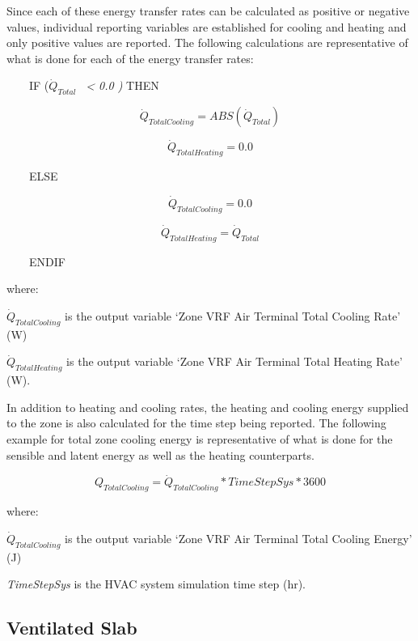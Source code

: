 Since each of these energy transfer rates can be calculated as positive or negative values, individual reporting variables are established for cooling and heating and only positive values are reported. The following calculations are representative of what is done for each of the energy transfer rates:

~~~~IF (\({\dot Q_{Total}}\) \emph{~\textless{} 0.0 )} THEN

\begin{equation}
{\dot Q_{TotalCooling}} = ABS ({\dot Q_{Total}})
\end{equation}

\begin{equation}
{\dot Q_{TotalHeating}} = 0.0
\end{equation}

~~~~ELSE

\begin{equation}
{\dot Q_{TotalCooling}} = 0.0
\end{equation}

\begin{equation}
{\dot Q_{TotalHeating}} = {\dot Q_{Total}}
\end{equation}

~~~~ENDIF

where:

\(\dot{Q}_{TotalCooling}\) is the output variable `Zone VRF Air Terminal Total Cooling Rate' (W)

\(\dot{Q}_{TotalHeating}\) is the output variable `Zone VRF Air Terminal Total Heating Rate' (W).

In addition to heating and cooling rates, the heating and cooling energy supplied to the zone is also calculated for the time step being reported. The following example for total zone cooling energy is representative of what is done for the sensible and latent energy as well as the heating counterparts.

\begin{equation}
  Q_{TotalCooling} = \dot{Q}_{TotalCooling} * TimeStepSys * 3600
\end{equation}

where:

\(\dot{Q}_{TotalCooling}\) is the output variable `Zone VRF Air Terminal Total Cooling Energy' (J)

\emph{TimeStepSys} is the HVAC system simulation time step (hr).

\subsection{Ventilated Slab}\label{ventilated-slab}


